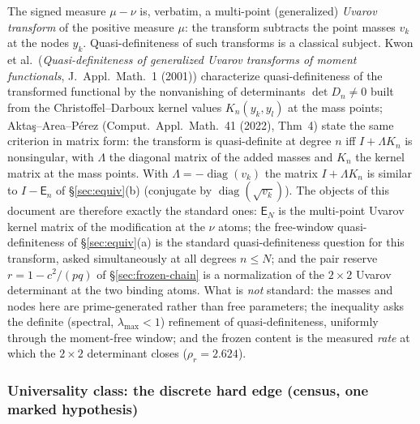 \documentclass[11pt]{article}
\theoremstyle{remark}
\newcommand{\E}{\mathsf{E}}
\begin{document}
The signed measure $\mu-\nu$ is, verbatim, a multi-point
(generalized) \emph{Uvarov transform} of the positive measure
$\mu$: the transform subtracts the point masses $v_{k}$ at the
nodes $y_{k}$.  Quasi-definiteness of such transforms is a
classical subject.  Kwon et al.\ (\emph{Quasi-definiteness of
generalized Uvarov transforms of moment functionals}, J.~Appl.\
Math.\ 1 (2001)) characterize quasi-definiteness of the
transformed functional by the nonvanishing of determinants
$\det D_{n}\neq0$ built from the Christoffel--Darboux kernel
values $K_{n}(y_{k},y_{l})$ at the mass points;
Akta\c{s}--Area--P\'erez (Comput.\ Appl.\ Math.\ 41 (2022),
Thm~4) state the same criterion in matrix form: the transform is
quasi-definite at degree $n$ iff $I+\Lambda K_{n}$ is
nonsingular, with $\Lambda$ the diagonal matrix of the added
masses and $K_{n}$ the kernel matrix at the mass points.  With
$\Lambda=-\operatorname{diag}(v_{k})$ the matrix $I+\Lambda
K_{n}$ is similar to $I-\E_{n}$ of \S\ref{sec:equiv}(b)
(conjugate by $\operatorname{diag}(\sqrt{v_{k}})$).  The objects
of this document are therefore exactly the standard ones:
$\E_{N}$ is the multi-point Uvarov kernel matrix of the
modification at the $\nu$ atoms; the free-window
quasi-definiteness of \S\ref{sec:equiv}(a) is the standard
quasi-definiteness question for this transform, asked
simultaneously at all degrees $n\le N$; and the pair reserve
$r=1-c^{2}/(pq)$ of \S\ref{sec:frozen-chain} is a normalization
of the $2\times2$ Uvarov determinant at the two binding atoms.
What is \emph{not} standard: the masses and nodes here are
prime-generated rather than free parameters; the inequality asks
the definite (spectral, $\lambda_{\max}<1$) refinement of
quasi-definiteness, uniformly through the moment-free window;
and the frozen content is the measured \emph{rate} at which the
$2\times2$ determinant closes ($\rho_{r}=2.624$).

\subsubsection*{Universality class: the discrete hard edge
(census, one marked hypothesis)}
\end{document}
